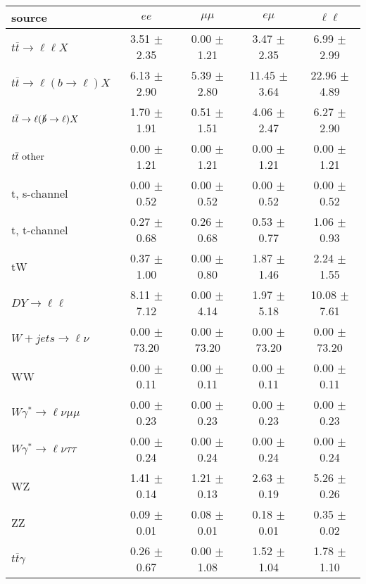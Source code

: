 \begin{tabular}{l|cccc} \hline\hline
source & $ee$ & $\mu\mu$ & $e\mu$ & $\ell\ell $ \\
\hline
$t\overline{t} \rightarrow \ell \ell X$ &  3.51 $\pm$  2.35 &  0.00 $\pm$  1.21 &  3.47 $\pm$  2.35 &  6.99 $\pm$  2.99 \\
$t\overline{t} \rightarrow \ell (b \rightarrow \ell) X$ &  6.13 $\pm$  2.90 &  5.39 $\pm$  2.80 & 11.45 $\pm$  3.64 & 22.96 $\pm$  4.89 \\
$t\overline{t} \rightarrow \ell (\slashed b \rightarrow \ell) X$ &  1.70 $\pm$  1.91 &  0.51 $\pm$  1.51 &  4.06 $\pm$  2.47 &  6.27 $\pm$  2.90 \\
        $t\overline{t}\ \rm{other}$ &  0.00 $\pm$  1.21 &  0.00 $\pm$  1.21 &  0.00 $\pm$  1.21 &  0.00 $\pm$  1.21 \\
\hline
                       t, s-channel &  0.00 $\pm$  0.52 &  0.00 $\pm$  0.52 &  0.00 $\pm$  0.52 &  0.00 $\pm$  0.52 \\
                       t, t-channel &  0.27 $\pm$  0.68 &  0.26 $\pm$  0.68 &  0.53 $\pm$  0.77 &  1.06 $\pm$  0.93 \\
                                 tW &  0.37 $\pm$  1.00 &  0.00 $\pm$  0.80 &  1.87 $\pm$  1.46 &  2.24 $\pm$  1.55 \\
\hline
         $DY \rightarrow \ell \ell$ &  8.11 $\pm$  7.12 &  0.00 $\pm$  4.14 &  1.97 $\pm$  5.18 & 10.08 $\pm$  7.61 \\
      $W+jets \rightarrow \ell \nu$ &  0.00 $\pm$ 73.20 &  0.00 $\pm$ 73.20 &  0.00 $\pm$ 73.20 &  0.00 $\pm$ 73.20 \\
                                 WW &  0.00 $\pm$  0.11 &  0.00 $\pm$  0.11 &  0.00 $\pm$  0.11 &  0.00 $\pm$  0.11 \\
\hline
$W\gamma^{*} \rightarrow \ell \nu \mu\mu$ &  0.00 $\pm$  0.23 &  0.00 $\pm$  0.23 &  0.00 $\pm$  0.23 &  0.00 $\pm$  0.23 \\
$W\gamma^{*} \rightarrow \ell \nu \tau\tau$ &  0.00 $\pm$  0.24 &  0.00 $\pm$  0.24 &  0.00 $\pm$  0.24 &  0.00 $\pm$  0.24 \\
                                 WZ &  1.41 $\pm$  0.14 &  1.21 $\pm$  0.13 &  2.63 $\pm$  0.19 &  5.26 $\pm$  0.26 \\
                                 ZZ &  0.09 $\pm$  0.01 &  0.08 $\pm$  0.01 &  0.18 $\pm$  0.01 &  0.35 $\pm$  0.02 \\
\hline
              $t\overline{t}\gamma$ &  0.26 $\pm$  0.67 &  0.00 $\pm$  1.08 &  1.52 $\pm$  1.04 &  1.78 $\pm$  1.10 \\

\end{tabular}
